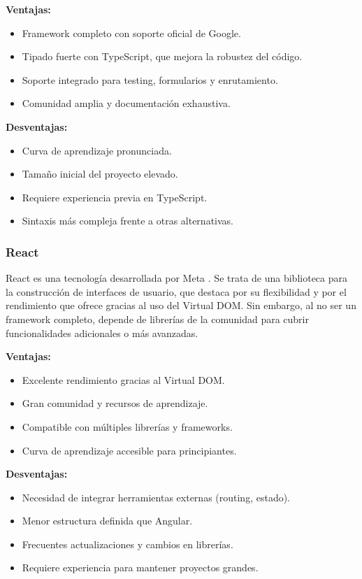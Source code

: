 \textbf{Ventajas:}
\begin{itemize}
    \item Framework completo con soporte oficial de Google.
    \item Tipado fuerte con TypeScript, que mejora la robustez del código.
    \item Soporte integrado para testing, formularios y enrutamiento.
    \item Comunidad amplia y documentación exhaustiva.
\end{itemize}

\textbf{Desventajas:}
\begin{itemize}
    \item Curva de aprendizaje pronunciada.
    \item Tamaño inicial del proyecto elevado.
    \item Requiere experiencia previa en TypeScript.
    \item Sintaxis más compleja frente a otras alternativas.
\end{itemize}

\subsubsection{React}
React es una tecnología desarrollada por Meta \cite{reactDocs}. Se trata de una biblioteca para la construcción de interfaces de usuario, que destaca por su flexibilidad y por el rendimiento que ofrece gracias al uso del Virtual DOM. Sin embargo, al no ser un framework completo, depende de librerías de la comunidad para cubrir funcionalidades adicionales o más avanzadas.

\textbf{Ventajas:}
\begin{itemize}
    \item Excelente rendimiento gracias al Virtual DOM.
    \item Gran comunidad y recursos de aprendizaje.
    \item Compatible con múltiples librerías y frameworks.
    \item Curva de aprendizaje accesible para principiantes.
\end{itemize}

\textbf{Desventajas:}
\begin{itemize}
    \item Necesidad de integrar herramientas externas (routing, estado).
    \item Menor estructura definida que Angular.
    \item Frecuentes actualizaciones y cambios en librerías.
    \item Requiere experiencia para mantener proyectos grandes.
\end{itemize}

